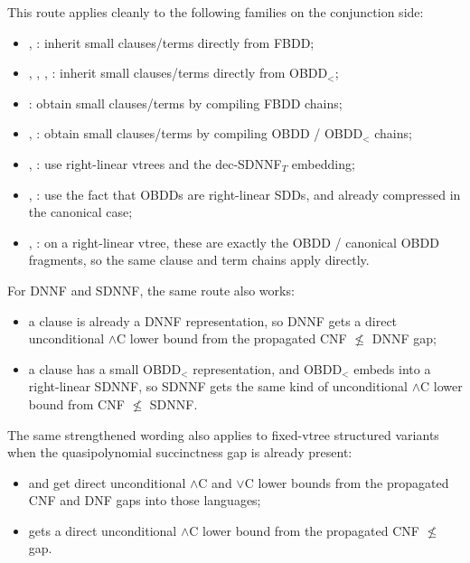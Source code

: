 \documentclass[11pt]{article}
\begin{document}
This route applies cleanly to the following families on the conjunction side:
\begin{itemize}[noitemsep]
  \item {}, : inherit small clauses/terms directly from FBDD;
  \item {}, , , : inherit small clauses/terms directly from OBDD$_<$;
  \item {}: obtain small clauses/terms by compiling FBDD chains;
  \item {}, : obtain small clauses/terms by compiling OBDD / OBDD$_<$ chains;
  \item {}, : use right-linear vtrees and the dec-SDNNF$_T$ embedding;
  \item {}, : use the fact that OBDDs are right-linear SDDs, and already compressed in the canonical case;
  \item {}, : on a right-linear vtree, these are exactly the OBDD / canonical OBDD fragments, so the same clause and term chains apply directly.
\end{itemize}

For DNNF and SDNNF, the same route also works:
\begin{itemize}[noitemsep]
  \item a clause is already a DNNF representation, so DNNF gets a direct unconditional $\land$C lower bound from the propagated CNF $\not\leq$ DNNF gap;
  \item a clause has a small OBDD$_<$ representation, and OBDD$_<$ embeds into a right-linear SDNNF, so SDNNF gets the same kind of unconditional $\land$C lower bound from CNF $\not\leq$ SDNNF.
\end{itemize}

The same strengthened wording also applies to fixed-vtree structured variants when the quasipolynomial succinctness gap is already present:
\begin{itemize}[noitemsep]
  \item {} and  get direct unconditional $\land$C and $\lor$C lower bounds from the propagated CNF and DNF gaps into those languages;
  \item {} gets a direct unconditional $\land$C lower bound from the propagated CNF $\not\leq$  gap.
\end{itemize}
\end{document}
